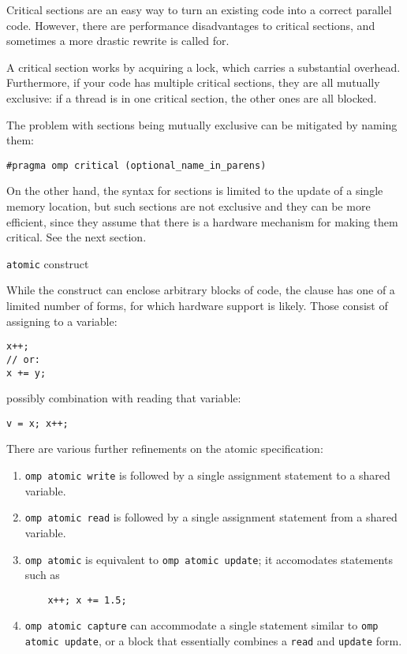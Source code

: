 Critical sections are an easy way to turn an existing code into a correct parallel code.
However, there are performance disadvantages to critical sections,
and sometimes a more drastic rewrite
is called for.

A critical section works by acquiring a lock, which carries a substantial overhead.
Furthermore, if your code has multiple critical sections, they are all mutually exclusive:
if a thread is in one critical section, the other ones are all blocked.

The problem with  sections being mutually exclusive can be mitigated by naming them:
\begin{lstlisting}
#pragma omp critical (optional_name_in_parens)
\end{lstlisting}

On the other hand, the syntax for  sections is limited to the update
of a single memory location, but such sections
are not exclusive and they can be more efficient, since they assume that there is a hardware
mechanism for making them critical. See the next section.

 {\texttt{atomic} construct}
\label{sec:atomic}

While the  construct can enclose arbitrary blocks of code,
the  clause has one of a limited number of forms,
for which hardware support is likely.
Those consist of assigning to a variable:
\begin{lstlisting}
x++;
// or:
x += y;
\end{lstlisting}
possibly combination with reading that variable:
\begin{lstlisting}
v = x; x++;
\end{lstlisting}

There are various further refinements on the atomic specification:
\begin{enumerate}
\item \lstinline{omp atomic write} is followed by  a single assignment statement
  to a shared variable.
\item \lstinline{omp atomic read} is followed by  a single assignment statement
  from a shared variable.
\item \lstinline{omp atomic} is equivalent to \lstinline{omp atomic update};
  it accomodates statements such as 
  \begin{lstlisting}
    x++; x += 1.5;
  \end{lstlisting}
\item \lstinline{omp atomic capture} can accommodate a single statement
  similar to \lstinline{omp atomic update},
  or a block that essentially combines a \lstinline{read} and \lstinline{update} form.
\end{enumerate}

